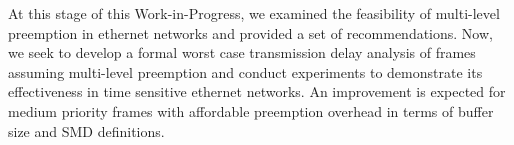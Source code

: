 At this stage of this Work-in-Progress, we examined the feasibility of multi-level preemption in ethernet networks and provided a set of recommendations. Now, we seek to develop a formal worst case transmission delay analysis of frames assuming multi-level preemption and conduct experiments to demonstrate its effectiveness in time sensitive ethernet networks. An improvement is expected for medium priority frames with affordable preemption overhead in terms of buffer size and SMD definitions.

